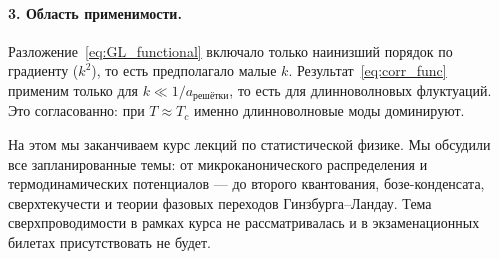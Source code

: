 \documentclass[../general/general]{subfiles}
\begin{document}
\paragraph{3. Область применимости.} Разложение~\eqref{eq:GL_functional} включало только наинизший порядок по градиенту ($k^2$), то есть предполагало малые $k$. Результат~\eqref{eq:corr_func} применим только для $k \ll 1/a_{\text{решётки}}$, то есть для длинноволновых флуктуаций. Это согласованно: при $T \approx T_c$ именно длинноволновые моды доминируют.

\bigskip

\noindent На этом мы заканчиваем курс лекций по статистической физике. Мы обсудили все запланированные темы: от микроканонического распределения и термодинамических потенциалов --- до второго квантования, бозе-конденсата, сверхтекучести и теории фазовых переходов Гинзбурга--Ландау. Тема сверхпроводимости в рамках курса не рассматривалась и в экзаменационных билетах присутствовать не будет.
\end{document}
